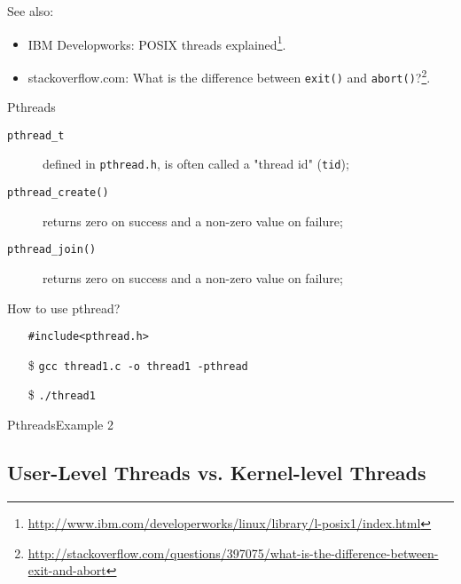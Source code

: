 See also:
\begin{itemize}
\item IBM Developworks: POSIX threads
  explained\footnote{\url{http://www.ibm.com/developerworks/linux/library/l-posix1/index.html}}.
\item stackoverflow.com: What is the difference between \texttt{exit()} and
  \texttt{abort()}?\footnote{\url{http://stackoverflow.com/questions/397075/what-is-the-difference-between-exit-and-abort}}.
\end{itemize}

\begin{frame}{Pthreads}
  \begin{description}
  \item[\texttt{pthread\_t}] defined in \texttt{pthread.h}, is often called a "thread id"
    (\texttt{tid});
  \item[\texttt{pthread\_create()}] returns zero on success and a non-zero value on failure;
  \item[\texttt{pthread\_join()}] returns zero on success and a non-zero value on failure;
  \end{description}
  \begin{block}{How to use pthread?}
    \begin{itemize}
    \item[] \texttt{\#include<pthread.h>}
    \item[\$] \texttt{gcc thread1.c -o thread1 -pthread}
    \item[\$] \texttt{./thread1}
    \end{itemize}
  \end{block}
\end{frame}

\begin{frame}{Pthreads}{Example 2}
  \begin{center}
  \end{center}
\end{frame}


\subsection{User-Level Threads vs. Kernel-level Threads}
\label{sec:user-threads-vs}

